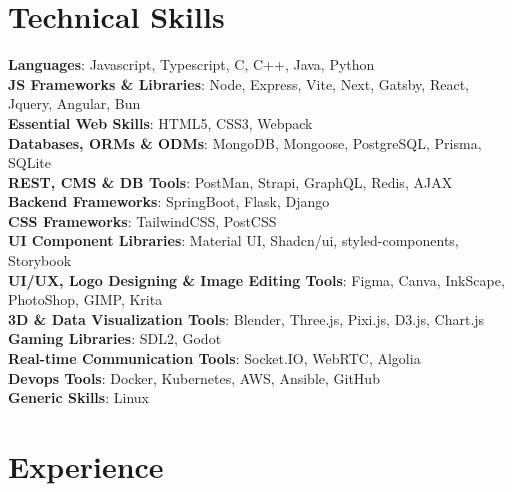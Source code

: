 \documentclass[letterpaper,11pt]{article}
\begin{document}
\section{Technical Skills}
 \begin{itemize}[leftmargin=0.1in, label={}]
    \small{\item{
     \textbf{Languages}{: Javascript, Typescript, C, C++, Java, Python} \\
     \textbf{JS Frameworks \& Libraries}{: Node, Express, Vite, Next, Gatsby, React, Jquery, Angular, Bun} \\
     \textbf{Essential Web Skills}{: HTML5, CSS3, Webpack} \\
     \textbf{Databases, ORMs \& ODMs}{: MongoDB, Mongoose, PostgreSQL, Prisma, SQLite} \\
     \textbf{REST, CMS \& DB Tools}{: PostMan, Strapi, GraphQL, Redis, AJAX} \\
     \textbf{Backend Frameworks}{: SpringBoot, Flask, Django} \\
     \textbf{CSS Frameworks}{: TailwindCSS, PostCSS}\\
     \textbf{UI Component Libraries}{: Material UI, Shadcn/ui, styled-components, Storybook }\\
     \textbf{UI/UX, Logo Designing \& Image Editing Tools}{: Figma, Canva, InkScape, PhotoShop, GIMP, Krita }\\
     \textbf{3D \& Data Visualization Tools}{: Blender, Three.js, Pixi.js, D3.js, Chart.js }\\
     \textbf{Gaming Libraries}{: SDL2, Godot }\\
     \textbf{Real-time Communication Tools}{: Socket.IO, WebRTC, Algolia }\\
     \textbf{Devops Tools}{: Docker, Kubernetes, AWS, Ansible, GitHub}\\
     \textbf{Generic Skills}{: Linux }\\
     
     
     
    }}
 \end{itemize}
 \vspace{-15pt}

\section{Experience}
\end{document}
